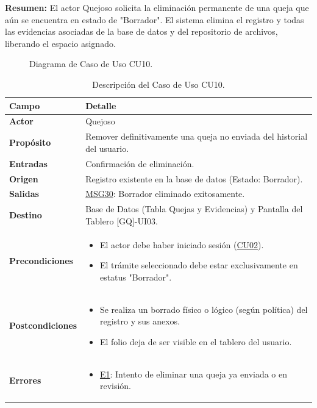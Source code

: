 \begin{appendices}
\textbf{Resumen:} 
El actor Quejoso solicita la eliminación permanente de una queja que aún se encuentra en estado de "Borrador". El sistema elimina el registro y todas las evidencias asociadas de la base de datos y del repositorio de archivos, liberando el espacio asignado.

\begin{figure}[htbp]
    \centering
    \figCUdiez
    \caption{Diagrama de Caso de Uso CU10.}
    \label{fig:cu10}
\end{figure}

\begin{table}[htbp]
\centering
\small
\begin{tabular}{|p{3.5cm}|p{10.5cm}|}
\hline
\rowcolor[HTML]{EFEFEF} 
\textbf{Campo} & \textbf{Detalle} \\ \hline
\textbf{Actor} & Quejoso \\ \hline
\textbf{Propósito} & Remover definitivamente una queja no enviada del historial del usuario. \\ \hline
\textbf{Entradas} & Confirmación de eliminación. \\ \hline
\textbf{Origen} & Registro existente en la base de datos (Estado: Borrador). \\ \hline
\textbf{Salidas} & \hyperlink{msg:MSG30}{MSG30}: Borrador eliminado exitosamente. \\ \hline
\textbf{Destino} & Base de Datos (Tabla Quejas y Evidencias) y Pantalla del Tablero [GQ]-UI03. \\ \hline
\textbf{Precondiciones} & 
\begin{itemize}[nosep, leftmargin=*]
    \item El actor debe haber iniciado sesión (\hyperlink{anexo:casos_uso}{CU02}).
    \item El trámite seleccionado debe estar exclusivamente en estatus "Borrador".
\end{itemize} \\ \hline
\textbf{Postcondiciones} & 
\begin{itemize}[nosep, leftmargin=*]
    \item Se realiza un borrado físico o lógico (según política) del registro y sus anexos.
    \item El folio deja de ser visible en el tablero del usuario.
\end{itemize} \\ \hline
\textbf{Errores} & 
\begin{itemize}[nosep, leftmargin=*]
    \item \hyperlink{err:E15}{E1}: Intento de eliminar una queja ya enviada o en revisión.
\end{itemize} \\ \hline
\end{tabular}
\caption{Descripción del Caso de Uso CU10.}
\label{tab:cu10_especificacion}
\end{table}


\end{appendices}
